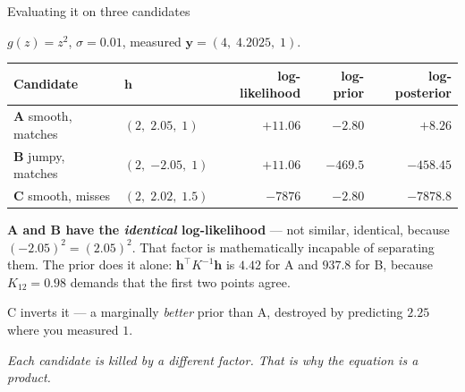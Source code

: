 \documentclass[aspectratio=169,11pt]{beamer}
\newcommand{\good}{\textcolor{green!50!black}}
\newcommand{\bad}{\textcolor{red!70!black}}
\begin{document}
\begin{frame}{Evaluating it on three candidates}

$g(z)=z^2$, $\sigma=0.01$, measured $\mathbf y=(4,\;4.2025,\;1)$.

\medskip
\begin{center}
\small
\begin{tabular}{llrrr}
\toprule
Candidate & $\mathbf h$ & log-likelihood & log-prior & log-posterior \\
\midrule
\textbf{A} smooth, matches & $(2,\;2.05,\;1)$            & $+11.06$      & $-2.80$        & \good{$+8.26$} \\
\textbf{B} jumpy, matches  & $(2,\;\mathbf{-2.05},\;1)$  & $+11.06$      & \bad{$-469.5$} & $-458.45$ \\
\textbf{C} smooth, misses  & $(2,\;2.02,\;\mathbf{1.5})$ & \bad{$-7876$} & $-2.80$        & $-7878.8$ \\
\bottomrule
\end{tabular}
\end{center}

\bigskip
\textbf{A and B have the \emph{identical} log-likelihood} --- not similar,
identical, because $(-2.05)^2=(2.05)^2$. That factor is mathematically incapable
of separating them. The prior does it alone: $\mathbf h^\top K^{-1}\mathbf h$ is
$4.42$ for A and $937.8$ for B, because $K_{12}=0.98$ demands that the first two
points agree.

\medskip
C inverts it --- a marginally \emph{better} prior than A, destroyed by predicting
$2.25$ where you measured $1$.

\bigskip
\centering
\emph{Each candidate is killed by a different factor. That is why the equation
is a product.}

\end{frame}
\end{document}
